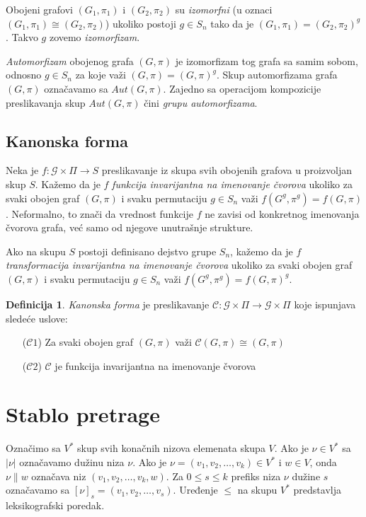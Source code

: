 \documentclass[12pt,oneside]{memoir}
\theoremstyle{definition}
\newtheorem*{definition}{Definicija}
\begin{document}
   Obojeni grafovi $(G_1, \pi_1)$ i $(G_2, \pi_2)$ su \emph{izomorfni} (u oznaci
   $(G_1, \pi_1) \cong (G_2, \pi_2)$) ukoliko postoji $g \in S_n$ tako da je
   $(G_1, \pi_1) = (G_2, \pi_2)^g$. Takvo $g$ zovemo \emph{izomorfizam}.

   \emph{Automorfizam} obojenog grafa $(G, \pi)$ je izomorfizam tog grafa sa
   samim sobom, odnosno $g \in S_n$ za koje važi $(G, \pi) = (G, \pi)^g$. Skup
   automorfizama grafa $(G, \pi)$ označavamo sa $Aut(G, \pi)$. Zajedno sa
   operacijom kompozicije preslikavanja skup $Aut(G, \pi)$ čini \emph{grupu
   automorfizama}.


   \subsection{Kanonska forma}

   Neka je $f : \mathcal{G} \times \Pi \to S$ preslikavanje iz skupa svih
   obojenih grafova u proizvoljan skup $S$.  Kažemo da je $f$ \emph{funkcija
   invarijantna na imenovanje čvorova} ukoliko za svaki obojen graf $(G, \pi)$
   i svaku permutaciju $g \in S_n$ važi $f(G^g, \pi^g) = f(G, \pi)$.
   Neformalno, to znači da vrednost funkcije $f$ ne zavisi od konkretnog
   imenovanja čvorova grafa, već samo od njegove unutrašnje strukture.

   Ako na skupu $S$ postoji definisano dejstvo grupe $S_n$, kažemo da je $f$
   \emph{transformacija invarijantna na imenovanje čvorova} ukoliko za svaki
   obojen graf $(G, \pi)$ i svaku permutaciju $g \in S_n$ važi $f(G^g, \pi^g) =
   f(G, \pi)^g$.


   \begin{definition}
	   \emph{Kanonska forma} je preslikavanje $\mathcal{C} : \mathcal{G} \times \Pi \to
	   \mathcal{G} \times \Pi$ koje ispunjava sledeće uslove:
	   \begin{itemize}
		   \item[($\mathcal{C}1$)] Za svaki obojen graf $(G, \pi)$ važi
			   $\mathcal{C}(G, \pi) \cong (G,
			\pi)$
		\item[($\mathcal{C}2$)] $\mathcal{C}$ je funkcija invarijantna na
			imenovanje čvorova
	   \end{itemize}
   \end{definition}


 \section{Stablo pretrage}

  Označimo sa $V^*$ skup svih konačnih nizova elemenata skupa $V$. Ako je $\nu
  \in V^*$ sa $|\nu|$ označavamo dužinu niza $\nu$. Ako je $\nu = (v_1, v_2,
  \dots, v_k) \in V^*$ i $w \in V$, onda $\nu \| w$ označava niz $(v_1, v_2,
  \dots, v_k, w)$. Za $0 \leq s \leq k$ prefiks niza $\nu$ dužine $s$ označavamo
  sa $[\nu]_s = (v_1, v_2, \dots, v_s)$. Uređenje $\leq$ na skupu $V^*$
  predstavlja leksikografski poredak.
\end{document}
